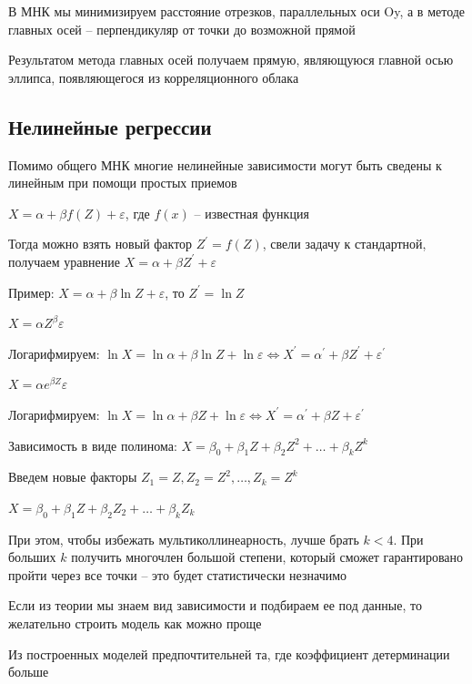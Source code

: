 В МНК мы минимизируем расстояние отрезков, параллельных оси Oy, а в методе главных осей -- перпендикуляр от точки до возможной прямой

Результатом метода главных осей получаем прямую, являющуюся главной осью эллипса, появляющегося из корреляционного облака

\subsection{Нелинейные регрессии}

Помимо общего МНК многие нелинейные зависимости могут быть сведены к линейным при помощи простых приемов

 $X = \alpha + \beta f(Z) + \varepsilon$, где $f(x)$ -- известная функция

Тогда можно взять новый фактор $Z^\prime = f(Z)$, свели задачу к стандартной, получаем уравнение $X = \alpha + \beta Z^\prime + \varepsilon$

Пример: $X = \alpha + \beta \ln Z + \varepsilon$, то $Z^\prime = \ln Z$

 $X = \alpha Z^\beta \varepsilon$

Логарифмируем: $\ln X = \ln \alpha + \beta \ln Z + \ln \varepsilon \Longleftrightarrow X^\prime = \alpha^\prime + \beta Z^\prime + \varepsilon^\prime$

 $X = \alpha e^{\beta Z} \varepsilon$

Логарифмируем: $\ln X = \ln \alpha + \beta Z + \ln \varepsilon \Longleftrightarrow X^\prime = \alpha^\prime + \beta Z + \varepsilon^\prime$

 Зависимость в виде полинома: $X = \beta_0 + \beta_1 Z + \beta_2 Z^2 + \dots + \beta_k Z^k$

Введем новые факторы $Z_1 = Z, Z_2 = Z^2, \dots, Z_k = Z^k$

$X = \beta_0 + \beta_1 Z + \beta_2 Z_2 + \dots + \beta_k Z_k$

При этом, чтобы избежать мультиколлинеарность, лучше брать $k < 4$. При больших $k$ получить многочлен большой степени, который сможет гарантировано пройти через все точки -- это будет статистически незначимо


\Nota Если из теории мы знаем вид зависимости и подбираем ее под данные, то желательно строить модель как можно проще

\Notas Из построенных моделей предпочтительней та, где коэффициент детерминации больше

\mediumvspace

